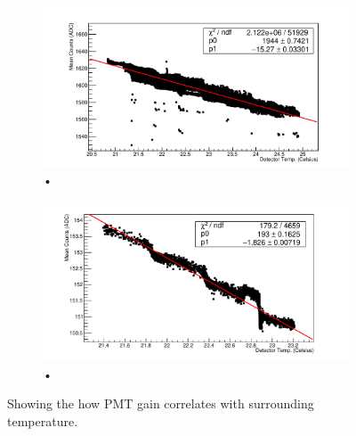 \begin{figure}
\centering
\begin{subfigure}[b]{\textwidth}
\includegraphics[width=\textwidth]{chapters/graphs/PMTchar/PMT900V_temperatureVsADC.pdf}
\caption{•}
\end{subfigure}
\begin{subfigure}[b]{\textwidth}
\includegraphics[width=\textwidth]{chapters/graphs/PMTchar/PMT600V_temperatureVsADC.pdf}
\caption{•}
\end{subfigure}
\caption{Showing the how PMT gain correlates with surrounding temperature.} \label{fig:PMTtemp_v_gain}
\end{figure}

